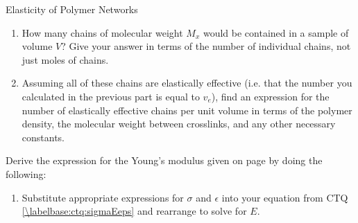 \begin{activity}{Elasticity of Polymer Networks}
\begin{exercises}
\begin{enumerate}
			\item How many chains of molecular weight $M_x$ would be contained in a sample of volume $V$?  Give your answer in terms of the  number of individual chains, not just moles of chains.
			
				\begin{solution}
				\end{solution}
			
			\item Assuming all of these chains are elastically effective (i.e. that the number you calculated in the previous part is equal to $v_e$), find an expression for the number of elastically effective chains per unit volume in terms of the polymer density, the molecular weight between crosslinks, and any other necessary constants.
			
				\begin{solution}
					\instructordisplay{$\frac{v_e}{V} = \frac{1}{V}\left(\frac{N_{av} \rho V}{M_x}\right) = \frac{N_{av} \rho}{M_x}$}
				\end{solution}
		\end{enumerate}
		
	\exercise Derive the expression for the Young's modulus given on page \pageref{\labelbase:eqn:youngsmodulus} by doing the following:
		
		\begin{enumerate}
			\item Substitute appropriate expressions for $\sigma$ and $\epsilon$ into your equation from CTQ \ref{\labelbase:ctq:sigmaEeps} and rearrange to solve for $E$.
			
				\begin{solution}\end{solution}
			

\end{enumerate}
\end{exercises}
\end{activity}
